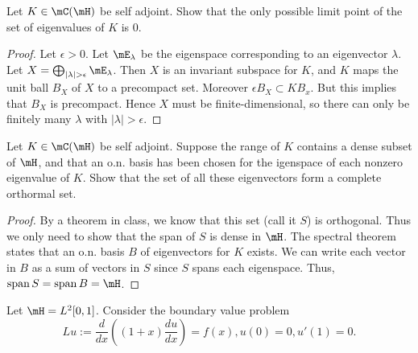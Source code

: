 \documentclass{article}
\begin{document}
 Let $K \in \mC(\mH)$ be self adjoint. Show that the only possible limit point of the set of eigenvalues of $K$ is 0.
\begin{proof}
Let $\epsilon > 0$. Let $\mE_\lambda$ be the eigenspace corresponding to an eigenvector $\lambda$.  Let $X = \bigoplus_{|\lambda| > \epsilon} \mE_\lambda$. Then $X$ is an invariant subspace for $K$, and $K$ maps the unit ball $B_X$ of $X$ to a precompact set. Moreover $\epsilon B_X \subset K B_x$. But this implies that $B_X$ is precompact.  Hence $X$ must be finite-dimensional, so there can only be finitely many $\lambda$ with $|\lambda| > \epsilon$.
\end{proof}


 Let $K \in \mC(\mH)$ be self adjoint. Suppose the range of $K$ contains a dense subset of $\mH$, and that an o.n. basis has been chosen for the igenspace of each nonzero eigenvalue of $K$. Show that the set of all these eigenvectors form a complete orthormal set.
\begin{proof}
By a theorem in class, we know that this set (call it $S$) is orthogonal. Thus we only need to show that the span of $S$ is dense in $\mH$. The spectral theorem states that an o.n. basis $B$ of eigenvectors for $K$ exists. We can write each vector in $B$ as a sum of vectors in $S$ since $S$ spans each eigenspace.  Thus, $\spn S = \spn B = \mH$.
\end{proof}


 Let $\mH = L^2[0,1]$. Consider the boundary value problem
$$Lu := \frac d {dx} \left( (1 + x) \frac {du} {dx} \right) = f(x),
u(0) = 0, u'(1) = 0.$$
\end{document}
